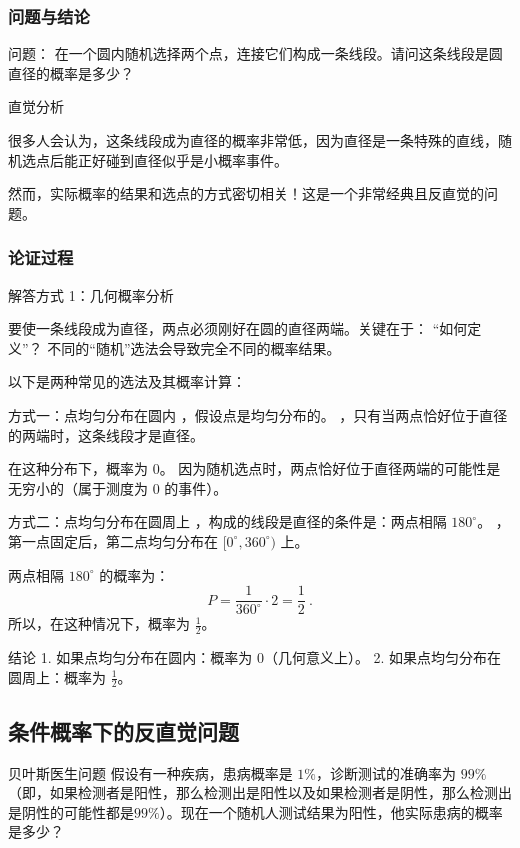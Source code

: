 \subsubsection{问题与结论}
问题：
在一个圆内随机选择两个点，连接它们构成一条线段。请问这条线段是圆直径的概率是多少？

直觉分析

很多人会认为，这条线段成为直径的概率非常低，因为直径是一条特殊的直线，随机选点后能正好碰到直径似乎是小概率事件。

然而，实际概率的结果和选点的方式密切相关！这是一个非常经典且反直觉的问题。


\subsubsection{论证过程}
解答方式 1：几何概率分析

要使一条线段成为直径，两点必须刚好在圆的直径两端。关键在于：
“如何定义”？
不同的“随机”选法会导致完全不同的概率结果。

以下是两种常见的选法及其概率计算：

方式一：点均匀分布在圆内
，假设点是均匀分布的。
，只有当两点恰好位于直径的两端时，这条线段才是直径。

在这种分布下，概率为 0。
因为随机选点时，两点恰好位于直径两端的可能性是无穷小的（属于测度为 0 的事件）。

方式二：点均匀分布在圆周上
，构成的线段是直径的条件是：两点相隔 $180^\circ$。
，第一点固定后，第二点均匀分布在 $[0^\circ, 360^\circ)$ 上。

两点相隔 $180^\circ$ 的概率为：
$$
P = \frac{1}{360^\circ} \cdot 2 = \frac{1}{2}~.
$$
所以，在这种情况下，概率为 $\frac{1}{2}$。

结论
	1.	如果点均匀分布在圆内：概率为 $0$（几何意义上）。
	2.	如果点均匀分布在圆周上：概率为 $\frac{1}{2}$。


\subsection{条件概率下的反直觉问题}

\begin{example}{贝叶斯医生问题}
假设有一种疾病，患病概率是 $1\%$，诊断测试的准确率为 $99\%$（即，如果检测者是阳性，那么检测出是阳性以及如果检测者是阴性，那么检测出是阴性的可能性都是$99\%$）。现在一个随机人测试结果为阳性，他实际患病的概率是多少？
\end{example}

